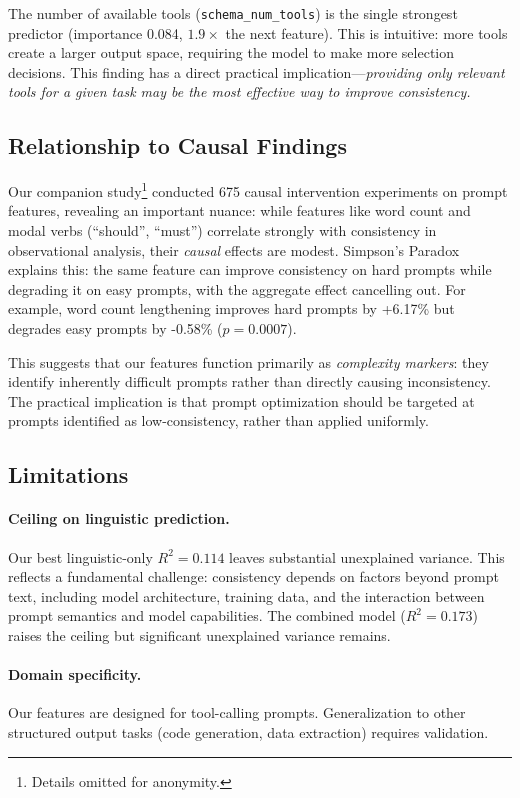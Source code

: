 \documentclass{article}
\begin{document}
The number of available tools (\texttt{schema\_num\_tools}) is the single strongest predictor (importance 0.084, $1.9\times$ the next feature). This is intuitive: more tools create a larger output space, requiring the model to make more selection decisions. This finding has a direct practical implication---\emph{providing only relevant tools for a given task may be the most effective way to improve consistency.}

\subsection{Relationship to Causal Findings}

Our companion study\footnote{Details omitted for anonymity.} conducted 675 causal intervention experiments on prompt features, revealing an important nuance: while features like word count and modal verbs (``should'', ``must'') correlate strongly with consistency in observational analysis, their \emph{causal} effects are modest. Simpson's Paradox explains this: the same feature can improve consistency on hard prompts while degrading it on easy prompts, with the aggregate effect cancelling out. For example, word count lengthening improves hard prompts by +6.17\% but degrades easy prompts by -0.58\% ($p = 0.0007$).

This suggests that our features function primarily as \emph{complexity markers}: they identify inherently difficult prompts rather than directly causing inconsistency. The practical implication is that prompt optimization should be targeted at prompts identified as low-consistency, rather than applied uniformly.

\subsection{Limitations}

\paragraph{Ceiling on linguistic prediction.}
Our best linguistic-only $R^2 = 0.114$ leaves substantial unexplained variance. This reflects a fundamental challenge: consistency depends on factors beyond prompt text, including model architecture, training data, and the interaction between prompt semantics and model capabilities. The combined model ($R^2 = 0.173$) raises the ceiling but significant unexplained variance remains.

\paragraph{Domain specificity.}
Our features are designed for tool-calling prompts. Generalization to other structured output tasks (code generation, data extraction) requires validation.
\end{document}
